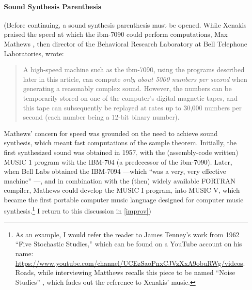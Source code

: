 
\paragraph{Sound Synthesis Parenthesis}
(Before continuing, a sound synthesis parenthesis must be opened. While Xenakis praised the speed at which the \gls{ibm-7090} could perform computations, Max Mathews \parencite{Mat63:The}, then director of the Behavioral Research Laboratory at Bell Telephone Laboratories, wrote:

\begin{quote}
	A high-speed machine such as the \gls{ibm-7090}, using the programs described later in this article, can compute \textit{only about 5000 numbers per second} when generating a reasonably complex sound. However, the numbers can be temporarily stored on one of the computer's digital magnetic tapes, and this tape can subsequently be replayed at rates up to 30,000 numbers per second (each number being a 12-bit binary number). \im \parencite[553]{Mat63:The}
\end{quote}

Mathews' concern for speed was grounded on the need to achieve sound synthesis, which meant fast computations of the sample theorem. Initially, the first synthesized sound was obtained in 1957, with the (assembly-code written) MUSIC 1 program with the IBM-704 (a predecessor of the \gls{ibm-7090}). Later, when Bell Labs obtained the IBM-7094 ---which ``was a very, very effective machine'' \parencite[16]{Roa80:Int}---, and in combination with the (then) widely available FORTRAN compiler, Mathews could develop the MUSIC I program, into MUSIC V, which became the first portable computer music language designed for computer music synthesis.\footnote{As an example, I would refer the reader to James Tenney's work from 1962 ``Five Stochastic Studies,'' which can be found on a YouTube account on his name: \url{https://www.youtube.com/channel/UCEzSaoPnxCJVzXxA9obuRWg/videos}. Roads, while interviewing Matthews recalls this piece to be named ``Noise Studies'' \parencite[18]{Roa80:Int}, which fades out the reference to Xenakis' music.} I return to this discussion in \ref{improv})

